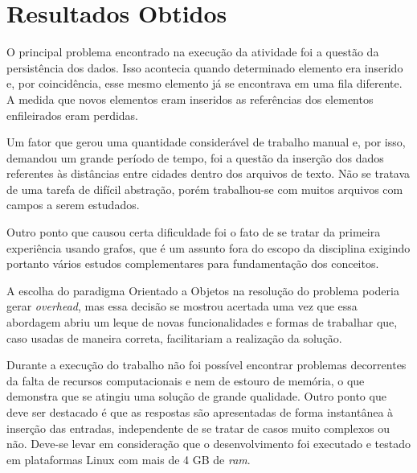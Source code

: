 \chapter[Resultados Obtidos]{Resultados Obtidos}

O principal problema encontrado na execução da atividade foi a questão da persistência dos
dados. Isso acontecia quando determinado elemento era inserido e, por coincidência, esse mesmo
elemento já se encontrava em uma fila diferente. A medida que novos elementos eram inseridos as referências dos elementos enfileirados eram perdidas.

Um fator que gerou uma quantidade considerável de trabalho manual e, por isso, demandou um grande período de tempo, foi a questão da inserção dos dados referentes às distâncias entre cidades dentro dos arquivos de
texto. Não se tratava de uma tarefa de difícil abstração, porém trabalhou-se com muitos arquivos com campos
a serem estudados.

Outro ponto que causou certa dificuldade foi o fato de se tratar da primeira experiência usando grafos,
que é um assunto fora do escopo da disciplina exigindo portanto vários estudos complementares para
fundamentação dos conceitos.

A escolha do paradigma Orientado a Objetos na resolução do problema poderia gerar \textit{overhead}, mas essa decisão se mostrou acertada uma vez que essa abordagem abriu um leque de novas funcionalidades e
formas de trabalhar que, caso usadas de maneira correta, facilitariam a realização da solução.

Durante a execução do trabalho não foi possível encontrar problemas decorrentes da falta de recursos
computacionais e nem de estouro de memória, o que demonstra que se atingiu uma solução de
grande qualidade. Outro ponto que deve ser destacado é que as respostas são apresentadas de forma instantânea à inserção das entradas, independente de se tratar de casos muito complexos ou não. Deve-se levar em consideração que o desenvolvimento foi executado e testado em plataformas Linux com mais de 4 GB de \textit{ram}.